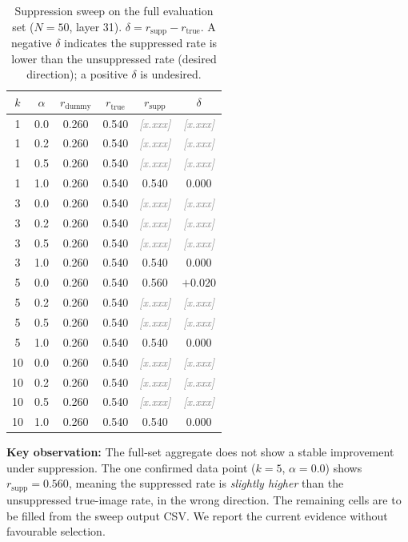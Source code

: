 \documentclass[12pt, a4paper]{article}
\newcommand{\placeholder}[1]{\textcolor{gray}{\textit{[#1]}}}
\begin{document}
\begin{table}[h]
\centering
\caption{Suppression sweep on the full evaluation set ($N = 50$, layer 31).
$\delta = r_{\text{supp}} - r_{\text{true}}$.
A negative $\delta$ indicates the suppressed rate is lower than the unsuppressed rate
(desired direction); a positive $\delta$ is undesired.}
\label{tab:sweep_full}
\begin{tabular}{cccccc}
\toprule
$k$ & $\alpha$ & $r_{\text{dummy}}$ & $r_{\text{true}}$ & $r_{\text{supp}}$ & $\delta$ \\
\midrule
 1 & 0.0 & 0.260 & 0.540 & \placeholder{x.xxx} & \placeholder{x.xxx} \\
 1 & 0.2 & 0.260 & 0.540 & \placeholder{x.xxx} & \placeholder{x.xxx} \\
 1 & 0.5 & 0.260 & 0.540 & \placeholder{x.xxx} & \placeholder{x.xxx} \\
 1 & 1.0 & 0.260 & 0.540 & 0.540 & 0.000 \\
\midrule
 3 & 0.0 & 0.260 & 0.540 & \placeholder{x.xxx} & \placeholder{x.xxx} \\
 3 & 0.2 & 0.260 & 0.540 & \placeholder{x.xxx} & \placeholder{x.xxx} \\
 3 & 0.5 & 0.260 & 0.540 & \placeholder{x.xxx} & \placeholder{x.xxx} \\
 3 & 1.0 & 0.260 & 0.540 & 0.540 & 0.000 \\
\midrule
 5 & 0.0 & 0.260 & 0.540 & 0.560 & $+0.020$ \\
 5 & 0.2 & 0.260 & 0.540 & \placeholder{x.xxx} & \placeholder{x.xxx} \\
 5 & 0.5 & 0.260 & 0.540 & \placeholder{x.xxx} & \placeholder{x.xxx} \\
 5 & 1.0 & 0.260 & 0.540 & 0.540 & 0.000 \\
\midrule
10 & 0.0 & 0.260 & 0.540 & \placeholder{x.xxx} & \placeholder{x.xxx} \\
10 & 0.2 & 0.260 & 0.540 & \placeholder{x.xxx} & \placeholder{x.xxx} \\
10 & 0.5 & 0.260 & 0.540 & \placeholder{x.xxx} & \placeholder{x.xxx} \\
10 & 1.0 & 0.260 & 0.540 & 0.540 & 0.000 \\
\bottomrule
\end{tabular}
\end{table}

\textbf{Key observation:} The full-set aggregate does not show a stable improvement
under suppression.
The one confirmed data point ($k=5$, $\alpha=0.0$) shows $r_{\text{supp}} = 0.560$,
meaning the suppressed rate is \emph{slightly higher} than the unsuppressed true-image
rate, in the wrong direction.
The remaining cells are to be filled from the sweep output CSV.
We report the current evidence without favourable selection.
\end{document}
